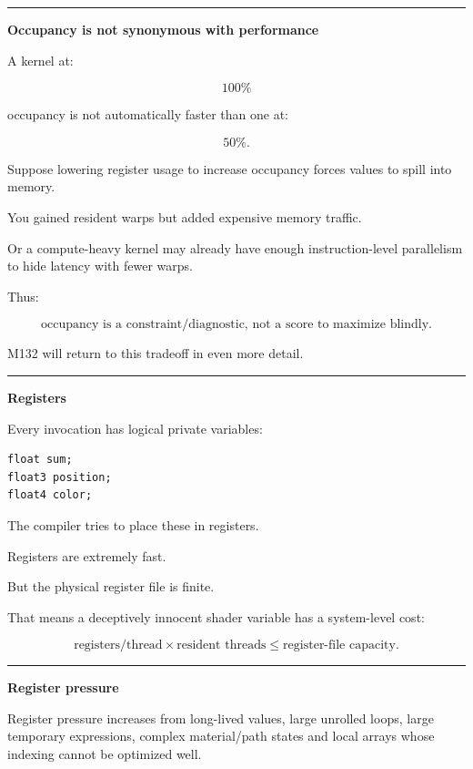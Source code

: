 \begin{center}\rule{0.5\linewidth}{0.5pt}\end{center}

\textbf{Occupancy is not synonymous with performance}

A kernel at:

\[
100\%
\]

occupancy is not automatically faster than one at:

\[
50\%.
\]

Suppose lowering register usage to increase occupancy forces values to spill into memory.

You gained resident warps but added expensive memory traffic.

Or a compute-heavy kernel may already have enough instruction-level parallelism to hide latency with fewer warps.

Thus:

\[
\boxed{
\text{occupancy is a constraint/diagnostic, not a score to maximize blindly}.
}
\]

M132 will return to this tradeoff in even more detail.

\begin{center}\rule{0.5\linewidth}{0.5pt}\end{center}

\textbf{Registers}

Every invocation has logical private variables:

\protect{}\label{t9jsa8}%
\begin{verbatim}
float sum;
float3 position;
float4 color;
\end{verbatim}

The compiler tries to place these in registers.

Registers are extremely fast.

But the physical register file is finite.

That means a deceptively innocent shader variable has a system-level cost:

\[
\boxed{
\text{registers/thread}
\times
\text{resident threads}
\le
\text{register-file capacity}.
}
\]

\begin{center}\rule{0.5\linewidth}{0.5pt}\end{center}

\textbf{Register pressure}

Register pressure increases from long-lived values, large unrolled loops, large temporary expressions, complex material/path states and local arrays whose indexing cannot be optimized well.

